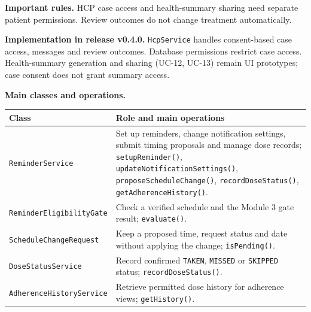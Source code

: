 \documentclass[10pt,letterpaper]{article}
\newenvironment{updated}{\par\color{pafourblue}}{\par}
\begin{document}
\noindent\textbf{Important rules.} HCP case access and health-summary sharing
need separate patient permissions. Review outcomes do not change treatment
automatically.

\begin{updated}
\noindent\textbf{Implementation in release v0.4.0.} \texttt{HcpService}
handles consent-based case access, messages and review outcomes. Database
permissions restrict case access. Health-summary generation and sharing
(UC-12, UC-13) remain UI prototypes; case consent does not grant summary access.
\end{updated}



\noindent\textbf{Main classes and operations.}\par\smallskip
\begingroup\small
\noindent\begin{tabularx}{\textwidth}{|L{0.37\textwidth}|Y|}
\hline
\textbf{Class} & \textbf{Role and main operations} \\ \hline
\texttt{ReminderService} & Set up reminders, change notification settings, submit timing proposals and manage dose records; \texttt{setupReminder()}, \texttt{updateNotificationSettings()}, \texttt{proposeScheduleChange()}, \texttt{recordDoseStatus()}, \texttt{getAdherenceHistory()}. \\ \hline
\texttt{ReminderEligibilityGate} & Check a verified schedule and the Module 3 gate result; \texttt{evaluate()}. \\ \hline
\texttt{ScheduleChangeRequest} & Keep a proposed time, request status and date without applying the change; \texttt{isPending()}. \\ \hline
\texttt{DoseStatusService} & Record confirmed \texttt{TAKEN}, \texttt{MISSED} or \texttt{SKIPPED} status; \texttt{recordDoseStatus()}. \\ \hline
\texttt{AdherenceHistoryService} & Retrieve permitted dose history for adherence views; \texttt{getHistory()}. \\ \hline
\end{tabularx}\par
\endgroup
\end{document}
